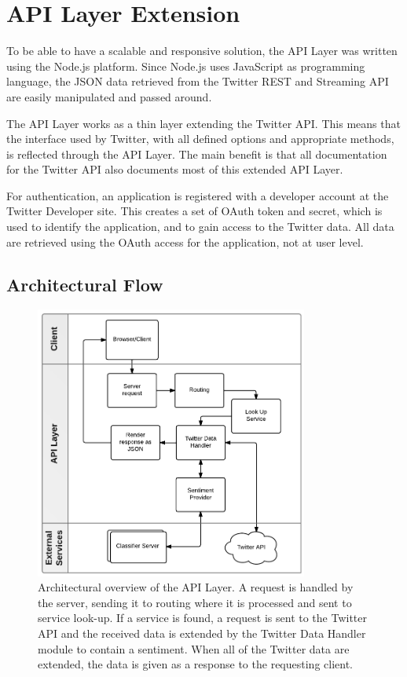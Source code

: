 \section{API Layer Extension}

To be able to have a scalable and responsive solution, the API Layer was written using the Node.js platform. Since Node.js uses JavaScript as programming language, the JSON data retrieved from the Twitter REST and Streaming API are easily manipulated and passed around. 

The API Layer works as a thin layer extending the Twitter API. This means that the interface used by Twitter, with all defined options and appropriate methods, is reflected through the API Layer. The main benefit is that all documentation for the Twitter API also documents most of this extended API Layer.

For authentication, an application is registered with a developer account at the Twitter Developer site. This creates a set of OAuth token and secret, which is used to identify the application, and to gain access to the Twitter data. All data are retrieved using the OAuth access for the application, not at user level. 

\subsection{Architectural Flow}


\begin{figure}[htb]
 \begin{center}
     \includegraphics[width=0.8\textwidth]{./figs/APILayerArcitechture.pdf}
 \end{center}
 \caption[Architectural overview of the API Layer.]{Architectural overview of the API Layer. A request is handled by the server, sending it to routing where it is processed and sent to service look-up. If a service is found, a request is sent to the Twitter API and the received data is extended by the Twitter Data Handler module to contain a sentiment. When all of the Twitter data are extended, the data is given as a response to the requesting client.}
 \label{fig:APILayerArcitechture.pdf}
\end{figure}

